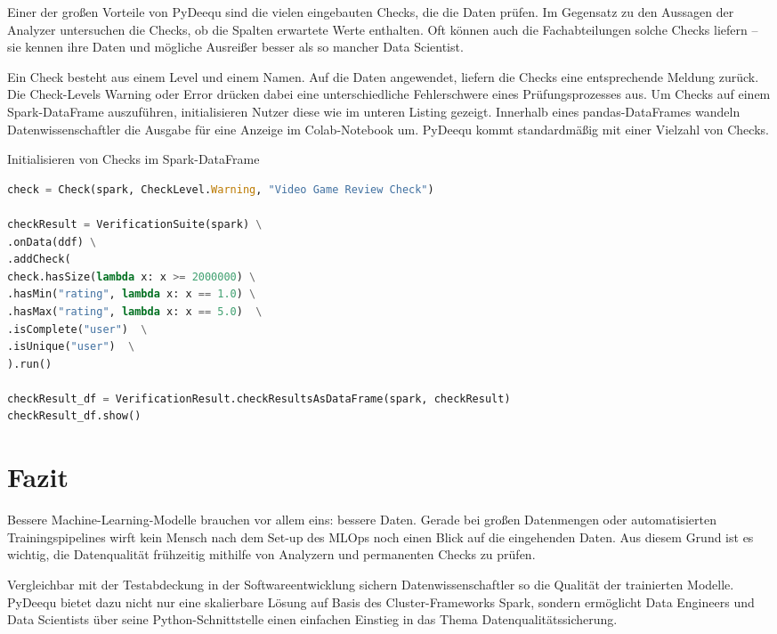 Einer der großen Vorteile von PyDeequ sind die vielen eingebauten Checks, die die Daten prüfen. Im Gegensatz zu den Aussagen der Analyzer untersuchen die Checks, ob die Spalten erwartete Werte enthalten. Oft können auch die Fachabteilungen solche Checks liefern – sie kennen ihre Daten und mögliche Ausreißer besser als so mancher Data Scientist.

Ein Check besteht aus einem Level und einem Namen. Auf die Daten angewendet, liefern die Checks eine entsprechende Meldung zurück. Die Check-Levels Warning oder Error drücken dabei eine unterschiedliche Fehlerschwere eines Prüfungsprozesses aus. Um Checks auf einem Spark-DataFrame auszuführen, initialisieren Nutzer diese wie im unteren Listing gezeigt. Innerhalb eines pandas-DataFrames wandeln Datenwissenschaftler die Ausgabe für eine Anzeige im Colab-Notebook um. PyDeequ kommt standardmäßig mit einer Vielzahl von Checks.


\begin{code}
    \caption{Initialisieren von Checks im Spark-DataFrame}
    
    \begin{lstlisting}[language=Python]
check = Check(spark, CheckLevel.Warning, "Video Game Review Check")

checkResult = VerificationSuite(spark) \
.onData(ddf) \
.addCheck(
check.hasSize(lambda x: x >= 2000000) \
.hasMin("rating", lambda x: x == 1.0) \
.hasMax("rating", lambda x: x == 5.0)  \
.isComplete("user")  \
.isUnique("user")  \
).run()

checkResult_df = VerificationResult.checkResultsAsDataFrame(spark, checkResult)
checkResult_df.show()
\end{lstlisting}
\end{code}
  
\section{Fazit}

Bessere Machine-Learning-Modelle brauchen vor allem eins: bessere Daten. Gerade bei großen Datenmengen oder automatisierten Trainingspipelines wirft kein Mensch nach dem Set-up des MLOps noch einen Blick auf die eingehenden Daten. Aus diesem Grund ist es wichtig, die Datenqualität frühzeitig mithilfe von Analyzern und permanenten Checks zu prüfen.

Vergleichbar mit der Testabdeckung in der Softwareentwicklung sichern Datenwissenschaftler so die Qualität der trainierten Modelle. PyDeequ bietet dazu nicht nur eine skalierbare Lösung auf Basis des Cluster-Frameworks Spark, sondern ermöglicht Data Engineers und Data Scientists über seine Python-Schnittstelle einen einfachen Einstieg in das Thema Datenqualitätssicherung.


